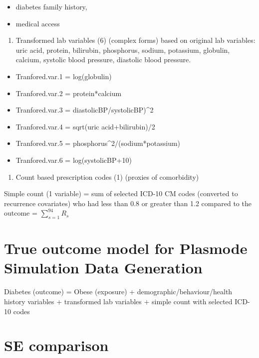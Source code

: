 \documentclass[
  10pt,
]{article}
\providecommand{\tightlist}{%
  \setlength{\itemsep}{0pt}\setlength{\parskip}{0pt}}
\begin{document}
\begin{itemize}
\tightlist
\item
  diabetes family history,
\item
  medical access
\end{itemize}

\begin{enumerate}
\def\labelenumi{\arabic{enumi}.}
\setcounter{enumi}{3}
\tightlist
\item
  Transformed lab variables (6) (complex forms) based on original lab
  variables: uric acid, protein, bilirubin, phosphorus, sodium,
  potassium, globulin, calcium, systolic blood pressure, diastolic blood
  pressure.
\end{enumerate}

\begin{itemize}
\tightlist
\item
  Tranfored.var.1 = log(globulin)
\item
  Tranfored.var.2 = protein*calcium
\item
  Tranfored.var.3 = diastolicBP/systolicBP)\^{}2
\item
  Tranfored.var.4 = sqrt(uric acid+bilirubin)/2
\item
  Tranfored.var.5 = phosphorus\^{}2/(sodium*potassium)
\item
  Tranfored.var.6 = log(systolicBP+10)
\end{itemize}

\begin{enumerate}
\def\labelenumi{\arabic{enumi}.}
\setcounter{enumi}{4}
\tightlist
\item
  Count based prescription codes (1) (proxies of comorbidity)
\end{enumerate}

Simple count (1 variable) = sum of selected ICD-10 CM codes (converted
to recurrence covariates) who had less than 0.8 or greater than 1.2
compared to the outcome = \(\sum_{s=1}^{94} R_s\)

\section{True outcome model for Plasmode Simulation Data
Generation}\label{true-outcome-model-for-plasmode-simulation-data-generation}

Diabetes (outcome) = Obese (exposure) + demographic/behaviour/health
history variables + transformed lab variables + simple count with
selected ICD-10 codes

\section{SE comparison}\label{se-comparison}
\end{document}
